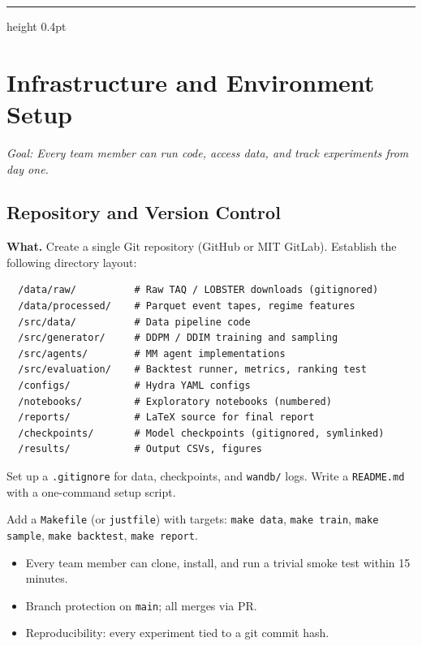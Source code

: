 \documentclass[11pt,a4paper]{article}
\begin{document}
\vspace{0.4cm}
\hrule height 0.4pt

\setcounter{section}{-1}
\section{Infrastructure and Environment Setup}

\textit{Goal: Every team member can run code, access data, and track experiments from day one.}

\subsection{Repository and Version Control}

\textbf{What.}
Create a single Git repository (GitHub or MIT GitLab).
Establish the following directory layout:

\begin{verbatim}
  /data/raw/          # Raw TAQ / LOBSTER downloads (gitignored)
  /data/processed/    # Parquet event tapes, regime features
  /src/data/          # Data pipeline code
  /src/generator/     # DDPM / DDIM training and sampling
  /src/agents/        # MM agent implementations
  /src/evaluation/    # Backtest runner, metrics, ranking test
  /configs/           # Hydra YAML configs
  /notebooks/         # Exploratory notebooks (numbered)
  /reports/           # LaTeX source for final report
  /checkpoints/       # Model checkpoints (gitignored, symlinked)
  /results/           # Output CSVs, figures
\end{verbatim}

Set up a \texttt{.gitignore} for data, checkpoints, and \texttt{wandb/} logs.
Write a \texttt{README.md} with a one-command setup script.

Add a \texttt{Makefile} (or \texttt{justfile}) with targets: \texttt{make data}, \texttt{make train}, \texttt{make sample}, \texttt{make backtest}, \texttt{make report}.

\begin{successbox}
  \begin{itemize}[nosep]
    \item Every team member can clone, install, and run a trivial smoke test within 15 minutes.
    \item Branch protection on \texttt{main}; all merges via PR.
    \item Reproducibility: every experiment tied to a git commit hash.
  \end{itemize}
\end{successbox}
\end{document}
